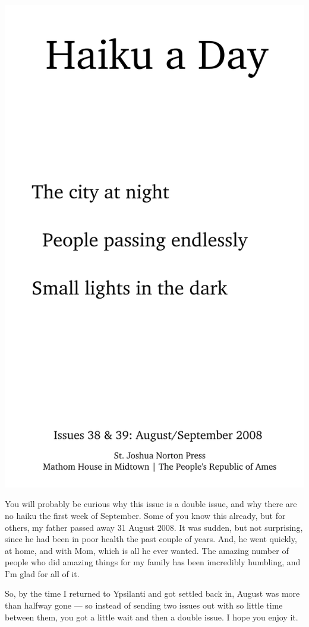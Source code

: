 \documentclass[12pt]{article}
\begin{document}
\includegraphics{frontpage.png}

\newpage

You will probably be curious why this issue is a double issue, and
why there are no haiku the first week of September. Some of you know
this already, but for others, my father passed away 31 August 2008.
It was sudden, but not surprising, since he had been in poor health
the past couple of years. And, he went quickly, at home, and with
Mom, which is all he ever wanted. The amazing number of people who 
did amazing things for my family has been imcredibly humbling, and
I'm glad for all of it.

So, by the time I returned to Ypsilanti and got settled back in, 
August was more than halfway gone --- so instead of sending two
issues out with so little time between them, you got a little wait
and then a double issue. I hope you enjoy it.
\end{document}

